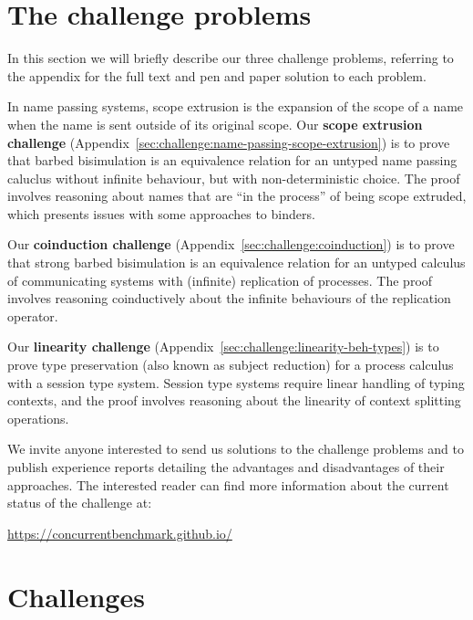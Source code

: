 \documentclass[adraft,copyright,creativecommons]{eptcs}
\begin{document}
\section{The challenge problems}
In this section we will briefly describe our three challenge problems, referring to the appendix for the full text and pen and paper solution to each problem.

In name passing systems, scope extrusion is the expansion of the scope of a name when the name is sent outside of its original scope.
Our \textbf{scope extrusion challenge} (Appendix~\ref{sec:challenge:name-passing-scope-extrusion}) is to prove that barbed bisimulation is an equivalence relation for an untyped name passing caluclus without infinite behaviour, but with non-deterministic choice.
The proof involves reasoning about names that are ``in the process'' of being scope extruded, which presents issues with some approaches to binders.

Our \textbf{coinduction challenge} (Appendix~\ref{sec:challenge:coinduction}) is to prove that strong barbed bisimulation is an equivalence relation for an untyped calculus of communicating systems with (infinite) replication of processes.
The proof involves reasoning coinductively about the infinite behaviours of the replication operator.

Our \textbf{linearity challenge} (Appendix~\ref{sec:challenge:linearity-beh-types}) is to prove type preservation (also known as subject reduction) for a process calculus with a session type system.
Session type systems require linear handling of typing contexts, and the proof involves reasoning about the linearity of context splitting operations.

We invite anyone interested to send us solutions to the challenge problems and to publish experience reports detailing the advantages and disadvantages of their approaches.
The interested reader can find more information about the current status of the challenge at:
\begin{center}
  \url{https://concurrentbenchmark.github.io/}
\end{center}




\appendix

\section{Challenges}

\end{document}
